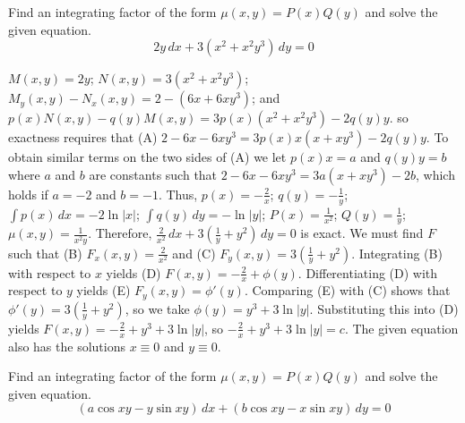 \documentclass{ximera}
\begin{document}
\begin{problem}\label{exer:2.6.20} Find an integrating factor of the form $\mu(x,y)=P(x)Q(y)$ and solve the given equation.
$$2y\,dx+ 3(x^2+x^2y^3)\,dy=0$$



\begin{solution}
    $M(x,y)=2y$;\;
$N(x,y)=3(x^2+x^2y^3)$;\;
 $M_y(x,y)-N_x(x,y)=2-(6x+6xy^3)$;
and  $p(x)N(x,y)-q(y)M(x,y)=3p(x)(x^2+x^2y^3)-2q(y)y$.
so exactness requires that
(A) $2-6x-6xy^3=3p(x)x(x+xy^3)-2q(y)y$.
To obtain  similar terms on the two sides of (A)
we let  $p(x)x=a$ and $q(y)y=b$  where $a$ and $b$ are constants
such that $2-6x-6xy^3=3a(x+xy^3)-2b$, which  holds if
$a=-2$ and $b=-1$. Thus,
 $p(x)=-\frac{2}{ x}$;\;
 $q(y)=-\frac{1}{ y}$;\;
$\int p(x)\,dx=-2\ln|x|$;\;
$\int q(y)\,dy=-\ln|y|$;\;
$P(x)=\frac{1}{ x^2}$;
$Q(y)=\frac{1}{ y}$;
$\mu(x,y)=\frac{1}{ x^2y}$.
Therefore,
$\frac{2}{ x^2}\,dx+3\left(\frac{1}{ y}+y^2\right)\,dy=0$
is exact.
We must find $F$ such that
(B) $F_x(x,y)=\frac{2}{ x^2}$ and
(C) $F_y(x,y)=3\left(\frac{1}{ y}+y^2\right)$.
Integrating (B) with respect to $x$ yields
(D) $F(x,y)=-\frac{2}{ x}+\phi(y)$.
Differentiating (D) with respect to $y$  yields
(E) $F_y(x,y)=\phi'(y)$.
Comparing (E) with (C)  shows that
$\phi'(y)=3\left(\frac{1}{ y}+y^2\right)$, so we take
$\phi(y)=y^3+3\ln|y|$.
Substituting this into (D) yields
$F(x,y)=-\frac{2}{ x}+y^3+3\ln|y|$,
so $-\frac{2}{ x}+y^3+3\ln|y|=c$.
The given equation also has the solutions $x\equiv0$
and $y\equiv0$.
\end{solution}
\end{problem}

\begin{problem}\label{exer:2.6.21}Find an integrating factor of the form $\mu(x,y)=P(x)Q(y)$ and solve the given equation.
$$(a\cos xy-y\sin xy)\,dx+(b\cos xy-x\sin xy)\,dy=0$$
\end{problem}
\end{document}
